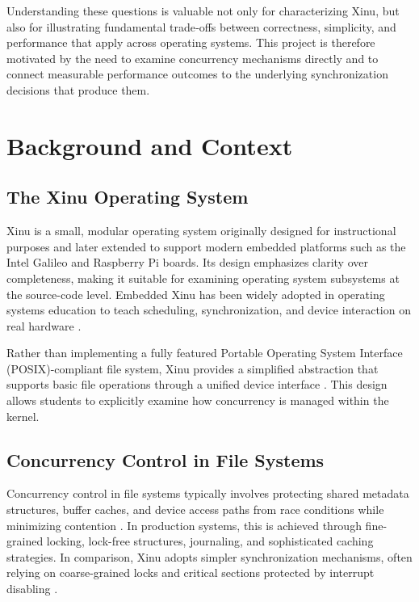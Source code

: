 \documentclass[sigconf]{acmart}
\begin{document}
Understanding these questions is valuable not only for characterizing Xinu, but also for illustrating fundamental trade‑offs between correctness, simplicity, and performance that apply across operating systems. This project is therefore motivated by the need to examine concurrency mechanisms directly and to connect measurable performance outcomes to the underlying synchronization decisions that produce them.





\section{Background and Context}
\label{sec:background}

\subsection{The Xinu Operating System}

Xinu is a small, modular operating system originally designed for instructional purposes and later extended to support modern embedded platforms such as the Intel Galileo and Raspberry Pi boards\cite{Carissimo1995XINUanET, Biggers2014PortingTE}. Its design emphasizes clarity over completeness, making it suitable for examining operating system subsystems at the source-code level. Embedded Xinu has been widely adopted in operating systems education to teach scheduling, synchronization, and device interaction on real hardware \cite{McGee2020UsingEX, Bansal2017XinuPi3TM}.

Rather than implementing a fully featured Portable Operating System Interface (POSIX)-compliant file system, Xinu provides a simplified abstraction that supports basic file operations through a unified device interface \cite{Beich2016OperatingSD}. This design allows students to explicitly examine how concurrency is managed within the kernel.


\subsection{Concurrency Control in File Systems}

Concurrency control in file systems typically involves protecting shared metadata structures, buffer caches, and device access paths from race conditions while minimizing contention \cite{2021ConcurrencyCA}. In production systems, this is achieved through fine-grained locking, lock-free structures, journaling, and sophisticated caching strategies. In comparison, Xinu adopts simpler synchronization mechanisms, often relying on coarse-grained locks and critical sections protected by interrupt disabling \cite{Beich2016OperatingSD}.
\end{document}
